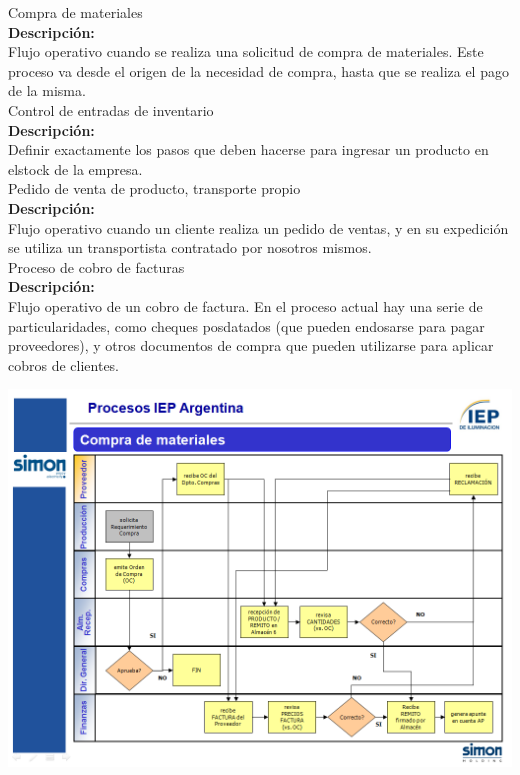 {\large{Compra de materiales}} \\
{\bf{Descripción:}} \\
Flujo operativo cuando se realiza una solicitud de compra de materiales. Este proceso va desde el origen de la necesidad de compra, hasta que se realiza el pago de la misma. \\

{\large{Control de entradas de inventario}} \\
{\bf{Descripción:}} \\
Definir exactamente los pasos que deben hacerse para ingresar un producto en elstock de la empresa. \\

{\large{Pedido de venta de producto, transporte propio}} \\
{\bf{Descripción:}} \\
Flujo operativo cuando un cliente realiza un pedido de ventas, y en su expedición se utiliza un transportista contratado por nosotros mismos. \\

{\large{Proceso de cobro de facturas}} \\
{\bf{Descripción:}} \\
Flujo operativo de un cobro de factura. En el proceso actual hay una serie de particularidades, como cheques posdatados (que pueden endosarse para pagar proveedores), y otros documentos de compra que pueden utilizarse para aplicar cobros de clientes.


\begin{center}
 \includegraphics[angle=90,scale=0.80,keepaspectratio=true]{./Images/Procesos-Circuitos-Originales-IEP/Circuito-Compras-IEP.png}
\end{center}

